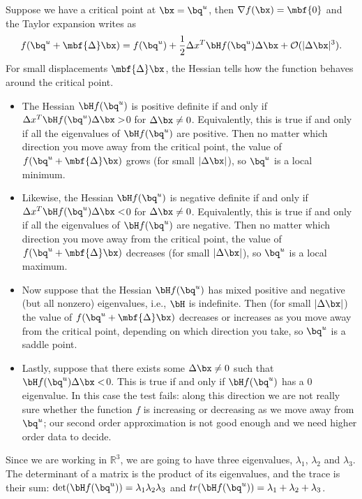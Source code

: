 \documentclass[10pt,a4paper]{article}
\begin{document}
Suppose we have a critical point at $\bx=\bq^u$, then $\mathbf{\nabla} f(\bx)=\mbf{0}$ and the Taylor expansion writes as
\begin{equation}
f(\bq^u + \mbf{\Delta} \bx)=f(\bq^u)+\frac{1}{2} \Delta x^T \bH f(\bq^u) \Delta \bx + \mathcal{O}(|\Delta \bx|^3).
\end{equation}
For small displacements $\mbf{\Delta} \bx$, the Hessian tells how the function behaves around the critical point.
\begin{itemize}
  \item  The Hessian $\bH f(\bq^u)$ is positive definite if and only if $\Delta x^T \bH f(\bq^u) \Delta \bx >$0 for $\Delta \bx \neq 0$. Equivalently, this is true if and only if all the eigenvalues of $\bH f(\bq^u)$ are positive. Then no matter which direction you move away from the critical point, the value of $f(\bq^u + \mbf{\Delta} \bx)$ grows (for small $|\Delta \bx|$), so $\bq^u$ is a local minimum.
  \item  Likewise, the Hessian $\bH f(\bq^u)$ is negative definite if and only if $\Delta x^T \bH f(\bq^u) \Delta \bx <$0 for $\Delta \bx \neq 0$. Equivalently, this is true if and only if all the eigenvalues of $\bH f(\bq^u)$ are negative. Then no matter which direction you move away from the critical point, the value of $f(\bq^u + \mbf{\Delta} \bx)$ decreases (for small $|\Delta \bx|$), so $\bq^u$ is a local maximum.
  \item  Now suppose that the Hessian $\bH f(\bq^u)$ has mixed positive and negative (but all nonzero) eigenvalues, i.e., $\bH$ is indefinite. Then (for small $|\Delta \bx|$) the value of $f(\bq^u + \mbf{\Delta} \bx)$ decreases or increases as you move away from the critical point, depending on which direction you take, so $\bq^u$ is a saddle point.
  \item Lastly, suppose that there exists some $\Delta \bx \neq 0$ such that $\bH f(\bq^u) \Delta \bx <$0. This is true if and only if $\bH f(\bq^u)$ has a 0 eigenvalue. In this case the test fails: along this direction we are not really sure whether the function $f$ is increasing or decreasing as we move away from $\bq^u$; our second order approximation is not good enough and we need higher order data to decide.
\end{itemize}
Since we are working in $ \mathbb{R}^3$, we are going to have three eigenvalues, $\lambda_1$, $\lambda_2$ and $\lambda_3$. The determinant of a matrix is the product of its eigenvalues, and the trace is their sum: $\det(\bH f(\bq^u))= \lambda_1 \lambda_2 \lambda_3$ and $tr(\bH f(\bq^u))= \lambda_1 + \lambda_2 + \lambda_3$.
\end{document}
